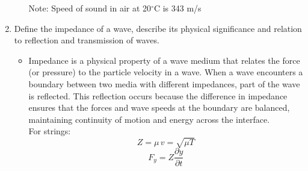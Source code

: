 \documentclass[12pt]{article}
\begin{document}
\begin{enumerate}
\begin{itemize}
\[\]
Note: Speed of sound in air at 20$^\circ$C is 343 m/s
\end{itemize}    
    \item Define the impedance of a wave, describe its physical significance and relation to reflection and transmission of waves.
\begin{itemize}
    \item Impedance is a physical property of a wave medium that relates the force (or pressure) to the particle velocity in a wave. When a wave encounters a boundary between two media with different impedances, part of the wave is reflected. This reflection occurs because the difference in impedance ensures that the forces and wave speeds at the boundary are balanced, maintaining continuity of motion and energy across the interface.
\\For strings:
\[
Z = \mu \, v = \sqrt{\mu T}
\]
\[
F_y =  Z \frac{\partial y}{\partial t}
\]


\end{itemize}
\end{enumerate}
\end{document}
